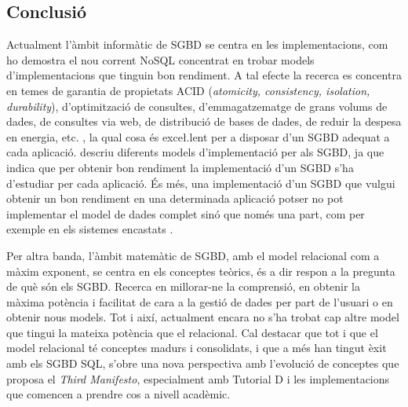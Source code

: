 


\subsection{Conclusió}


Actualment l'àmbit informàtic de SGBD se centra en les
implementacions, com ho demostra el nou corrent NoSQL concentrat en
trobar models d'implementacions que tinguin bon rendiment. A tal
efecte la recerca es concentra en temes de garantia de propietats ACID
(\emph{atomicity, consistency, isolation, durability}), d'optimització
de consultes, d'emmagatzematge de grans volums de dades, de consultes
via web, de distribució de bases de dades, de reduir la despesa en
energia, etc. \parencite{stonebraker07,stonebraker10}, la qual cosa és
exce\l.lent per a disposar d'un SGBD adequat a cada aplicació.
\textcite{haerder05:_dbms_archit} descriu diferents models d'implementació per als SGBD, ja que indica que per obtenir bon rendiment la implementació d'un SGBD s'ha d'estudiar per cada aplicació. És més, una implementació d'un SGBD que vulgui  obtenir un bon rendiment en una determinada aplicació potser no pot implementar el model de dades complet sinó que només una part, com per exemple en els sistemes encastats \parencite{saake09:_downs_data_manag_embed_system}.

Per altra banda, l'àmbit matemàtic de SGBD, amb el model relacional
com a màxim exponent, se centra en els conceptes teòrics, és a dir
respon a la pregunta de què són els SGBD. Recerca en millorar-ne la
comprensió, en obtenir la màxima potència i facilitat de cara a la
gestió de dades per part de l'usuari o en obtenir nous models. Tot i
així, actualment encara no s'ha trobat cap altre model que tingui la
mateixa potència que el relacional. Cal destacar que tot i que el
model relacional té conceptes madurs i consolidats, i que a més han
tingut èxit amb els SGBD SQL, s'obre una nova perspectiva amb
l'evolució de conceptes que proposa el \emph{Third Manifesto},
especialment amb Tutorial D i les implementacions que comencen a prendre
cos a nivell acadèmic.





















